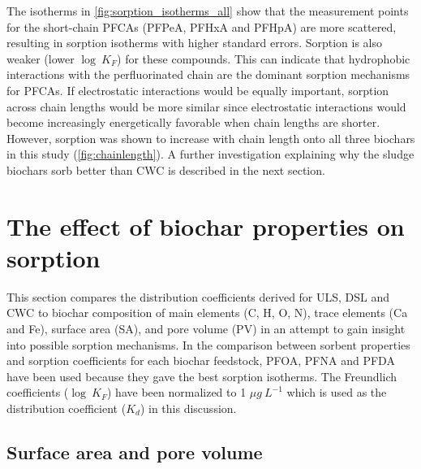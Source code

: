 The isotherms in \cref{fig:sorption_isotherms_all} show that the measurement points for the short-chain PFCAs (PFPeA, PFHxA and PFHpA) are more scattered, resulting in sorption isotherms with higher standard errors. Sorption is also weaker (lower $\log~K_F$) for these compounds. This can indicate that hydrophobic interactions with the perfluorinated chain are the dominant sorption mechanisms for PFCAs. If electrostatic interactions would be equally important, sorption across chain lengths would be more similar since electrostatic interactions would become increasingly energetically favorable when chain lengths are shorter. However, sorption was shown to increase with chain length onto all three biochars in this study (\cref{fig:chainlength}). A further investigation explaining why the sludge biochars sorb better than CWC is described in the next section. 


\section{The effect of biochar properties on sorption}
This section compares the distribution coefficients derived for ULS, DSL and CWC to biochar composition of main elements (C, H, O, N), trace elements (Ca and Fe), surface area (SA), and pore volume (PV) in an attempt to gain insight into possible sorption mechanisms. In the comparison between sorbent properties and sorption coefficients for each biochar feedstock, PFOA, PFNA and PFDA have been used because they gave the best sorption isotherms. The Freundlich coefficients ($\log~K_F$) have been normalized to 1 $\mu g~L^{-1}$ which is used as the distribution coefficient ($K_d$) in this discussion.

\subsection{Surface area and pore volume}

